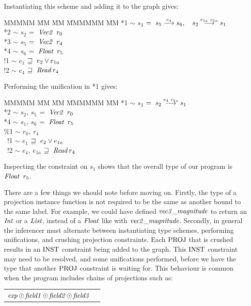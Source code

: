 \clearpage{}
Instantiating this scheme and adding it to the graph gives:
\begin{tabbing}
MMMMM	\= MM 	\= MM 		\= MMMMMM 	\= MM \kill
	\> *1	\> $\sim$	\> $s_3$	\> $= \ s_5 \stackrel{e_4}{\longrightarrow} s_6, 
							\quad s_2 \stackrel{e_{1a} \ c_{1a}}{\longrightarrow} s_1$ \\
	\> *2	\> $\sim$	\> $s_2$	\> $= \ \operatorname{\mathit{Vec2}} \ r_0$ \\
	\> *3	\> $\sim$	\> $s_5$	\> $= \ \operatorname{\mathit{Vec2}} \ r_4$ \\
	\> *4	\> $\sim$	\> $s_6$	\> $= \ \operatorname{\mathit{Float}} \ r_5$ \\
	\> !1	\> $\sim$	\> $e_1$	\> $\sqsupseteq \ e_2 \lor e_{1a}$ \\
	\> !2	\> $\sim$	\> $e_4$	\> $\sqsupseteq \ \operatorname{\mathit{Read}} r_4$
\end{tabbing}
Performing the unification in *1 gives:
\begin{tabbing}
MMMMM	\= MM 	\= MM 		\= MMMMMM 		\= MM \kill
	\> *1	\> $\sim$	\> $s_3$		\> $= \ s_2 \stackrel{e_4 \ c_{1a}}{\longrightarrow} s_1$ \\
	\> *2	\> $\sim$	\> $s_2, \ s_5$		\> $= \ \operatorname{\mathit{Vec2}} \ r_0$ \\
	\> *4	\> $\sim$	\> $s_1, \ s_6$		\> $= \ \operatorname{\mathit{Float}} \ r_5$ \\
	\> \%1	\> $\sim$	\> $r_0, \ r_4$	 \\	
	\> \ !1	\> $\sim$	\> $e_1$		\> $\sqsupseteq \ e_2 \lor e_{1a}$ \\
	\> \ !2	\> $\sim$	\> $e_4, \ e_{1a}$	\> $\sqsupseteq \ \operatorname{\mathit{Read}} r_4$
\end{tabbing}

Inspecting the constraint on $s_1$ shows that the overall type of our program is $\operatorname{\mathit{Float}} \ r_5$. 

There are a few things we should note before moving on. Firstly, the type of a projection instance function is not required to be the same as another bound to the same label. For example, we could have defined $\operatorname{\mathit{vec3\_magnitude}}$ to return an $\operatorname{\mathit{Int}}$ or a $\operatorname{\mathit{List}}$, instead of a $\operatorname{\mathit{Float}}$ like with $\operatorname{\mathit{vec2\_magnitude}}$. Secondly, in general the inferencer must alternate between instantiating type schemes, performing unifications, and crushing projection constraints. Each $\textrm{PROJ}$ that is crushed results in an $\textrm{INST}$ constraint being added to the graph. This $\textrm{INST}$ constraint may need to be resolved, and some unifications performed, before we have the type that another $\textrm{PROJ}$ constraint is waiting for. This behaviour is common when the program includes chains of projections such as:

\qq\qq
\begin{tabular}{ll}
	$\operatorname{\mathit{exp}} \odot \operatorname{\mathit{field1}} \odot \operatorname{\mathit{field2}} \odot \operatorname{\mathit{field3}}$
\end{tabular}

